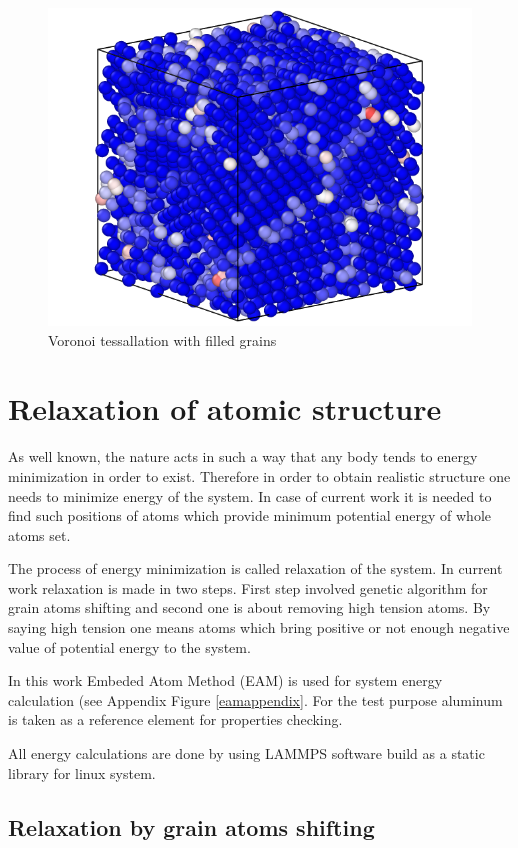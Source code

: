 \documentclass[12pt]{report}
\begin{document}
\begin{figure}
    \centering
    \includegraphics[width=5.0in]{cube_filled}
    \caption{Voronoi tessallation with filled grains}
    \label{cubefilled}
\end{figure}

\section{Relaxation of atomic structure}

As well known, the nature acts in such a way that any body tends to energy minimization in order to exist. Therefore in order to obtain realistic structure one needs to minimize energy of the system. In case of current work it is needed to find such positions of atoms which provide minimum potential energy of whole atoms set.

The process of energy minimization is called relaxation of the system. In current work relaxation is made in two steps. First step involved genetic algorithm for grain atoms shifting and second one is about removing high tension atoms. By saying high tension one means atoms which bring positive or not enough negative value of potential energy to the system.

In this work Embeded Atom Method (EAM) is used for system energy calculation (see Appendix Figure \ref{eamappendix}. For the test purpose aluminum is taken as a reference element for properties checking. 

All energy calculations are done by using LAMMPS software build as a static library for linux system.

\subsection{Relaxation by grain atoms shifting}
\end{document}
